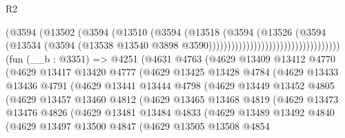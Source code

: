 \begin{lexlean}{R2}
\begin{coremodule}
                                                  (@3594
                                                    (@13502
                                                      (@3594
                                                        (@13510
                                                          (@3594
                                                            (@13518
                                                              (@3594
                                                                (@13526
                                                                  (@3594
                                                                    (@13534
                                                                      (@3594
                                                                        (@13538
                                                                          @13540
                                                                          @3898
                                                                          @3590)))))))))))))))))))))))))))))))))))
    (fun (__b : @3351) =>
    @4251
      (@4631
        @4763
        (@4629
          @13409
          @13412
          @4770
          (@4629
            @13417
            @13420
            @4777
            (@4629
              @13425
              @13428
              @4784
              (@4629
                @13433
                @13436
                @4791
                (@4629
                  @13441
                  @13444
                  @4798
                  (@4629
                    @13449
                    @13452
                    @4805
                    (@4629
                      @13457
                      @13460
                      @4812
                      (@4629
                        @13465
                        @13468
                        @4819
                        (@4629
                          @13473
                          @13476
                          @4826
                          (@4629
                            @13481
                            @13484
                            @4833
                            (@4629
                              @13489
                              @13492
                              @4840
                              (@4629
                                @13497
                                @13500
                                @4847
                                (@4629
                                  @13505
                                  @13508
                                  @4854

\end{coremodule}
\end{lexlean}
